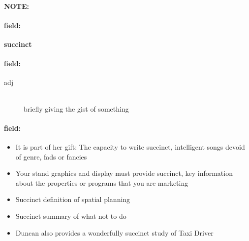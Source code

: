 \documentclass[12pt]{article}
\newenvironment{note}{\paragraph{NOTE:}}{}
\newenvironment{field}{\paragraph{field:}}{}
\begin{document}
\begin{note}
\begin{field}
\textbf{\large succinct}
\end{field}


\begin{field}
\begin{description}
\item[adj] \hfill \\ 
briefly giving the gist of something

\end{description}
\end{field}

\begin{field}
\begin{itemize}
\item It is part of her gift: The capacity to write succinct, intelligent songs devoid of genre, fads or fancies
\item Your stand graphics and display must provide succinct, key information about the properties or programs that you are marketing
\item Succinct definition of spatial planning
\item Succinct summary of what not to do
\item Duncan also provides a wonderfully succinct study of Taxi Driver
\end{itemize}
\end{field}
\end{note}
\end{document}
